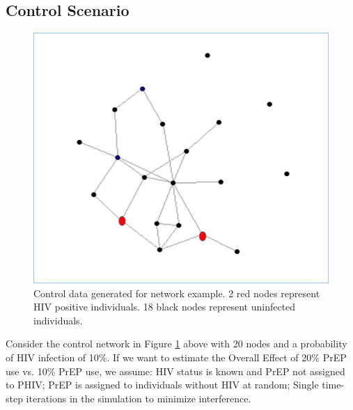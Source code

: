 \documentclass{article}
\theoremstyle{definition}
\begin{document}
\subsection{Control Scenario}
\begin{figure}[H]
    \centering
    \includegraphics[scale=0.5]{Figures/Network Example 1.png}
    \caption{Control data generated for network example. 2 red nodes represent HIV positive individuals. 18 black nodes represent uninfected individuals.}
    \label{fig: Figure 2}
\end{figure}
Consider the control network in Figure \ref{fig: Figure 2}  above with 20 nodes and a probability of HIV infection of 10\%. If we want to estimate the Overall Effect of 20\% PrEP use vs. 10\% PrEP use, we assume: HIV status is known and PrEP not assigned to PHIV; PrEP is assigned to individuals without HIV at random; Single time-step iterations in the simulation to minimize interference.
\end{document}
